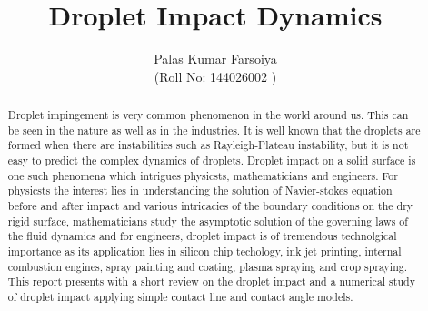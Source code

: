 \documentclass[seminar,twoside]{iitbreport}
\begin{document}
\title{Droplet Impact Dynamics}
\author{Palas Kumar Farsoiya \\ (Roll No: 144026002 )}

\maketitle
%
%
\begin{abstract}
 Droplet impingement is very common phenomenon in the world around us. This can be seen in the nature as well as in the industries. It is well known
 that the droplets are formed when there are instabilities such as Rayleigh-Plateau instability, but it is not easy to predict the complex dynamics of droplets. Droplet impact 
 on a solid surface is one such phenomena which intrigues physicsts, mathematicians and engineers. For physicsts the interest lies in understanding the solution of Navier-stokes
 equation before and after impact and various intricacies of the boundary conditions on the dry rigid surface,  mathematicians study the asymptotic solution of the governing laws
 of the fluid dynamics and for engineers, droplet impact is of tremendous technolgical importance as its application lies in silicon chip techology, ink jet printing, internal combustion engines, spray painting and coating,
 plasma spraying and crop spraying. This report presents with a short review on the droplet impact and a numerical study of droplet impact applying simple contact line and contact angle
 models.
\end{abstract}

\tableofcontents

\listoftables
\listoffigures

\cleardoublepage
\setcounter{page}{1}

%
%
    
%
%
%


\end{document}
